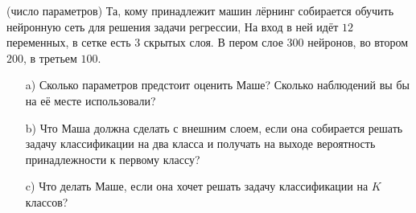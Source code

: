 \begin{problem}{(число параметров)}
	Та, кому принадлежит машин лёрнинг собирается обучить нейронную сеть для решения задачи регрессии, На вход в ней идёт $12$ переменных, в сетке есть $3$ скрытых слоя. В пером слое $300$ нейронов, во втором $200$, в третьем $100$. 
	
	\begin{itemize}
		\item[a)] Сколько параметров предстоит оценить Маше?  Сколько наблюдений вы бы на её месте использовали? 
		\item[b)] Что Маша должна сделать с внешним слоем, если она собирается решать задачу классификации на два класса и получать на выходе вероятность принадлежности к первому классу? 
		\item[c)]  Что делать Маше, если она хочет решать задачу классификации на $K$ классов? 
	\end{itemize}
\end{problem}
